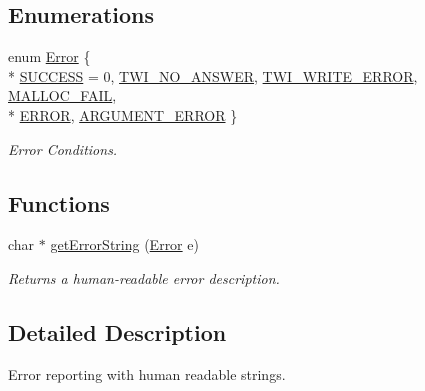 \subsection*{Enumerations}
\begin{DoxyCompactItemize}
\item 
enum \hyperlink{group__error_ga2c3e4bb40f36b262a5214e2da2bca9c5}{Error} \{ \\*
\hyperlink{group__error_gga2c3e4bb40f36b262a5214e2da2bca9c5ac7f69f7c9e5aea9b8f54cf02870e2bf8}{S\-U\-C\-C\-E\-S\-S} = 0, 
\hyperlink{group__error_gga2c3e4bb40f36b262a5214e2da2bca9c5a04d5943ba652af2205c88b247e0c659c}{T\-W\-I\-\_\-\-N\-O\-\_\-\-A\-N\-S\-W\-E\-R}, 
\hyperlink{group__error_gga2c3e4bb40f36b262a5214e2da2bca9c5ac0e3b3463dcaf220e54794b4711708c9}{T\-W\-I\-\_\-\-W\-R\-I\-T\-E\-\_\-\-E\-R\-R\-O\-R}, 
\hyperlink{group__error_gga2c3e4bb40f36b262a5214e2da2bca9c5a89a164ff453c45893033cf318906c2d7}{M\-A\-L\-L\-O\-C\-\_\-\-F\-A\-I\-L}, 
\\*
\hyperlink{group__error_gga2c3e4bb40f36b262a5214e2da2bca9c5a2fd6f336d08340583bd620a7f5694c90}{E\-R\-R\-O\-R}, 
\hyperlink{group__error_gga2c3e4bb40f36b262a5214e2da2bca9c5a49ccf277a69dd938c591928aa27c66cc}{A\-R\-G\-U\-M\-E\-N\-T\-\_\-\-E\-R\-R\-O\-R}
 \}
\begin{DoxyCompactList}\small\item\em Error Conditions. \end{DoxyCompactList}\end{DoxyCompactItemize}
\subsection*{Functions}
\begin{DoxyCompactItemize}
\item 
char $\ast$ \hyperlink{group__error_ga6ad4aa1b927ea2ceb2c29b5693ddee53}{get\-Error\-String} (\hyperlink{group__error_ga2c3e4bb40f36b262a5214e2da2bca9c5}{Error} e)
\begin{DoxyCompactList}\small\item\em Returns a human-\/readable error description. \end{DoxyCompactList}\end{DoxyCompactItemize}


\subsection{Detailed Description}
Error reporting with human readable strings. 


